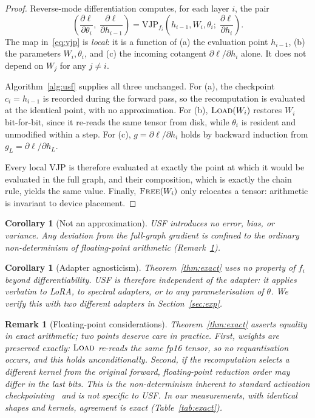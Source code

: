 \documentclass[preprint,12pt]{elsarticle}
\newtheorem{corollary}[theorem]{Corollary}
\newtheorem{remark}[theorem]{Remark}
\newcommand{\usf}{USF}
\newcommand{\VJP}{\mathrm{VJP}}
\begin{document}
\begin{proof}
Reverse-mode differentiation computes, for each layer $i$, the pair
\begin{equation}
\label{eq:vjp}
\left(\frac{\partial\ell}{\partial\theta_i},\; \frac{\partial\ell}{\partial h_{i-1}}\right)
= \VJP_{f_i}\!\left(h_{i-1}, W_i, \theta_i;\; \frac{\partial\ell}{\partial h_i}\right).
\end{equation}
The map in~\eqref{eq:vjp} is \emph{local}: it is a function of (a) the evaluation point $h_{i-1}$,
(b) the parameters $W_i,\theta_i$, and (c) the incoming cotangent $\partial\ell/\partial h_i$
alone. It does not depend on $W_j$ for any $j \neq i$.

Algorithm~\ref{alg:usf} supplies all three unchanged. For (a), the checkpoint $c_i = h_{i-1}$ is recorded
during the forward pass, so the recomputation is evaluated at the identical point, with no
approximation. For (b), $\textsc{Load}(W_i)$ restores $W_i$ bit-for-bit, since it re-reads the same
tensor from disk, while $\theta_i$ is resident and unmodified within a step. For (c),
$g=\partial\ell/\partial h_i$ holds by backward induction from $g_L = \partial\ell/\partial h_L$.

Every local VJP is therefore evaluated at exactly the point at which it would be evaluated in the
full graph, and their composition, which is exactly the chain rule, yields the same value.
Finally, $\textsc{Free}(W_i)$ only relocates a tensor: arithmetic is invariant to device placement.
\end{proof}

\begin{corollary}[Not an approximation]
\label{cor:noapprox}
\usf{} introduces no error, bias, or variance. Any deviation from the full-graph gradient is
confined to the ordinary non-determinism of floating-point arithmetic (Remark~\ref{rem:fp}).
\end{corollary}

\begin{corollary}[Adapter agnosticism]
\label{cor:agnostic}
Theorem~\ref{thm:exact} uses no property of $f_i$ beyond differentiability. \usf{} is therefore
independent of the adapter: it applies verbatim to LoRA, to spectral adapters, or to any
parameterisation of $\theta$. We verify this with two different adapters in Section~\ref{sec:exp}.
\end{corollary}

\begin{remark}[Floating-point considerations]
\label{rem:fp}
Theorem~\ref{thm:exact} asserts equality in exact arithmetic; two points deserve care in practice. First,
weights are preserved exactly: $\textsc{Load}$ re-reads the same fp16 tensor, so no requantisation
occurs, and this holds unconditionally. Second, if the recomputation selects a different kernel
from the original forward, floating-point reduction order may differ in the last bits. This is the
non-determinism inherent to standard activation checkpointing~\cite{chen2016checkpointing} and is
not specific to \usf{}. In our measurements, with identical shapes and kernels, agreement is exact
(Table~\ref{tab:exact}).
\end{remark}
\end{document}
